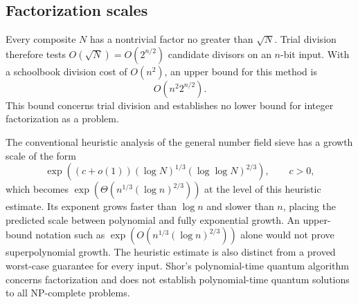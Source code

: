 \documentclass[11pt,oneside,openany]{book}
\theoremstyle{definition}
\begin{document}
\subsection{Factorization scales}
Every composite $N$ has a nontrivial factor no greater than $\sqrt N$. Trial division therefore tests $O(\sqrt N)=O(2^{n/2})$ candidate divisors on an $n$-bit input. With a schoolbook division cost of $O(n^2)$, an upper bound for this method is
\begin{equation}
 O(n^2 2^{n/2}).
\end{equation}
This bound concerns trial division and establishes no lower bound for integer factorization as a problem.

The conventional heuristic analysis of the general number field sieve has a growth scale of the form~\cite{Pomerance1996}
\begin{equation}
 \exp\!\left((c+o(1))(\log N)^{1/3}(\log\log N)^{2/3}\right),
 \qquad c>0,
\end{equation}
which becomes $\exp(\Theta(n^{1/3}(\log n)^{2/3}))$ at the level of this heuristic estimate. Its exponent grows faster than $\log n$ and slower than $n$, placing the predicted scale between polynomial and fully exponential growth. An upper-bound notation such as $\exp(O(n^{1/3}(\log n)^{2/3}))$ alone would not prove superpolynomial growth. The heuristic estimate is also distinct from a proved worst-case guarantee for every input. Shor's polynomial-time quantum algorithm concerns factorization and does not establish polynomial-time quantum solutions to all NP-complete problems.
\end{document}
